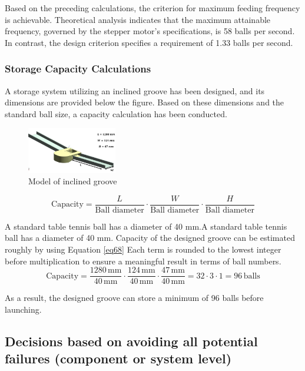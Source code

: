 \documentclass[12pt]{report}
\begin{document}
Based on the preceding calculations, the criterion for maximum feeding frequency is achievable. Theoretical analysis indicates that the maximum attainable frequency, governed by the stepper motor's specifications, is 58 balls per second. In contrast, the design criterion specifies a requirement of 1.33 balls per second. 

\subsubsection{Storage Capacity Calculations}

A storage system utilizing an inclined groove has been designed, and its dimensions are provided below the figure. Based on these dimensions and the standard ball size, a capacity calculation has been conducted.

\begin{figure}[h!]
    \centering
    \includegraphics[width=0.35\textwidth]{Figures/Figures/storage capacity.png} 
    \caption{Model of inclined groove}
    \label{fig:storage} 
\end{figure}

\begin{equation}
\label{eq68}
\text{Capacity} = \frac{L}{\text{Ball diameter}} \cdot \frac{W}{\text{Ball diameter}} \cdot \frac{H}{\text{Ball diameter}}
\end{equation}

A standard table tennis ball has a diameter of 40 mm.A standard table tennis ball has a diameter of 40 mm. Capacity of the designed groove can be estimated roughly by using Equation \ref{eq68}
Each term is rounded to the lowest integer before multiplication to ensure a meaningful result in terms of ball numbers.
\begin{equation}
\text{Capacity} = \frac{1280 \, \text{mm}}{40 \, \text{mm}} \cdot \frac{124 \, \text{mm}}{40 \, \text{mm}} \cdot \frac{47 \, \text{mm}}{40 \, \text{mm}} = 32 \cdot 3 \cdot 1 = 96 \, \text{balls}
\end{equation}

As a result, the designed groove can store a minimum of 96 balls before launching.

\subsection{Decisions based on avoiding all potential failures (component or system level)}
\end{document}
